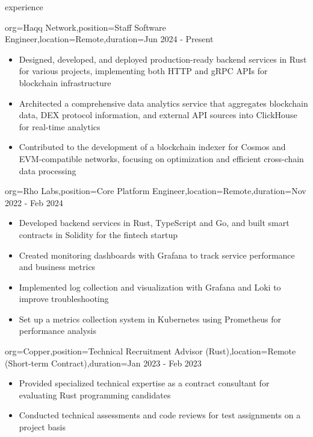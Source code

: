 \documentclass{resume}
\begin{document}
\begin{ResumeSection}{experience}
\begin{ResumeSubsection}{org=Haqq Network,position=Staff Software Engineer,location=Remote,duration=Jun 2024 - Present}
        \begin{itemize}
            \item Designed, developed, and deployed production-ready backend services in Rust for various projects, implementing both HTTP and gRPC APIs for blockchain infrastructure
            \item Architected a comprehensive data analytics service that aggregates blockchain data, DEX protocol information, and external API sources into ClickHouse for real-time analytics
            \item Contributed to the development of a blockchain indexer for Cosmos and EVM-compatible networks, focusing on optimization and efficient cross-chain data processing
        \end{itemize}
    \end{ResumeSubsection}

    \begin{ResumeSubsection}{org=Rho Labs,position=Core Platform Engineer,location=Remote,duration=Nov 2022 - Feb 2024}
    \begin{itemize}
        \item Developed backend services in Rust, TypeScript and Go, and built smart contracts in Solidity for the fintech startup
        \item Created monitoring dashboards with Grafana to track service performance and business metrics
        \item Implemented log collection and visualization with Grafana and Loki to improve troubleshooting
        \item Set up a metrics collection system in Kubernetes using Prometheus for performance analysis
    \end{itemize}
\end{ResumeSubsection}

    \begin{ResumeSubsection}{org=Copper,position=Technical Recruitment Advisor (Rust),location=Remote (Short-term Contract),duration=Jan 2023 - Feb 2023}
        \begin{itemize}
            \item Provided specialized technical expertise as a contract consultant for evaluating Rust programming candidates
            \item Conducted technical assessments and code reviews for test assignments on a project basis
        \end{itemize}
    \end{ResumeSubsection}


\end{ResumeSection}
\end{document}
